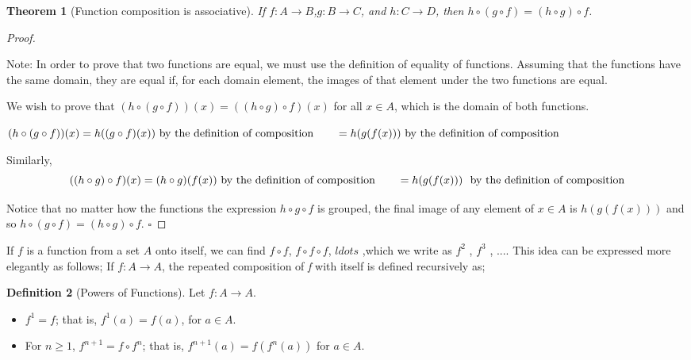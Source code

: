 \documentclass[10pt,]{book}
\theoremstyle{plain}
\newtheorem{theorem}{Theorem}[section]
\theoremstyle{definition}
\newtheorem{definition}[theorem]{Definition}
\theoremstyle{definition}
\theoremstyle{definition}
\begin{document}
\begin{theorem}[Function composition is associative]\label{function-composition-associative}
If \(f:A\rightarrow B\),\(g:B\to C\), and \(h:C\rightarrow D\), then \(h\circ (g\circ f) = (h\circ g)\circ f\).%
\end{theorem}
\begin{proof}\hypertarget{proof-2}{}
Note: In order to prove that two functions are equal, we must use the definition of equality of functions. Assuming that the functions
have the same domain, they are equal if, for each domain element, the images of that element under the two functions are equal.%
\par
We wish to prove that \((h\circ (g\circ f))(x) = ((h\circ g)\circ f)(x)\) for all \(x \in  A\), which is the domain of both functions.%
\par

\((h\circ (g\circ f))(x)= h((g\circ f) (x))\textrm{   by the definition of composition}\\
\\
\quad \quad =h(g(f(x)))\textrm{   by the definition of composition}\)%
\par
Similarly,
\begin{equation*}((h\circ g)\circ f)(x)= (h\circ g)(f(x))\textrm{  by the definition of composition}\\
\\
\quad \quad =h(g(f(x)))\text{  }\textrm{  by the definition of composition}\end{equation*}%
\par
Notice that no matter how the functions the expression \(h\circ g\circ f\) is grouped, the final image of any element of \(x\in A\) is \(h(g(f(x)))\)
and so \(h\circ (g\circ f) = (h\circ g)\circ f\).  \(\square\)%
\end{proof}
\par
If \(f\) is a function from a set \(A\) onto itself, we can find \(f\circ  f\), \(f\circ  f\circ  f\), \(ldots\) ,which we write as
\(f^2\) , \(f^3\) , .... This idea can be expressed more elegantly as follows; If \(f: A \rightarrow  A\), the repeated composition of \textit{
f} with itself is defined recursively as;%
\begin{definition}[Powers of Functions]\label{def-powers-of-functions}
\label{notation-6}
Let \(f: A\to A\).%
\par
\leavevmode%
\begin{itemize}[label=\textbullet]
\item{} \(f^1= f\);  that is, \(f^1(a) = f(a)\), for \(a \in A\).%
\item{} For \(n\geq 1\), \(f^{n+1}= f\circ f^n\);  that is, \(f^{n+1}(a)=f\left( f^n(a)\right)\) for \(a \in A\).%
\end{itemize}
%
\end{definition}
\end{document}
